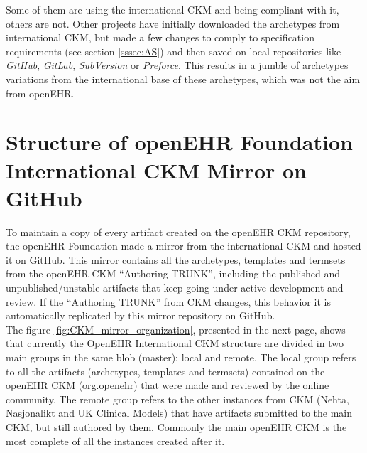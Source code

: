 \documentclass[mim_thesis.tex]{subfiles}
\begin{document}
Some of them are using the international CKM and being compliant with it, others are not. Other projects have initially downloaded the archetypes from international CKM, but made a few changes to comply to specification requirements (see section \ref{sssec:AS}) and then saved on local repositories like \textit{GitHub}, \textit{GitLab}, \textit{SubVersion} or \textit{Preforce}. This results in a jumble of archetypes variations from the international base of these archetypes, which was not the aim from openEHR. \\

\section{Structure of openEHR Foundation International CKM Mirror on GitHub}
To maintain a copy of every artifact created on the openEHR CKM repository, the openEHR Foundation made a mirror from the international CKM and hosted it on GitHub. This mirror contains all the archetypes, templates and termsets from the openEHR CKM “Authoring TRUNK”, including the published and unpublished/unstable artifacts that keep going under active development and review. If the “Authoring TRUNK” from CKM changes, this behavior it is automatically replicated by this mirror repository on GitHub. \\

The figure \ref{fig:CKM_mirror_organization}, presented in the next page, shows that currently the OpenEHR International CKM structure are divided in two main groups in the same blob (master): local and remote. The local group refers to all the artifacts (archetypes, templates and termsets) contained on the openEHR CKM (org.openehr) that were made and reviewed by the online community. The remote group refers to the other instances from CKM (Nehta, Nasjonalikt and UK Clinical Models) that have artifacts submitted to the main CKM, but still authored by them. Commonly the main openEHR CKM is the most complete of all the instances created after it. 

\vfill
~
\end{document}
